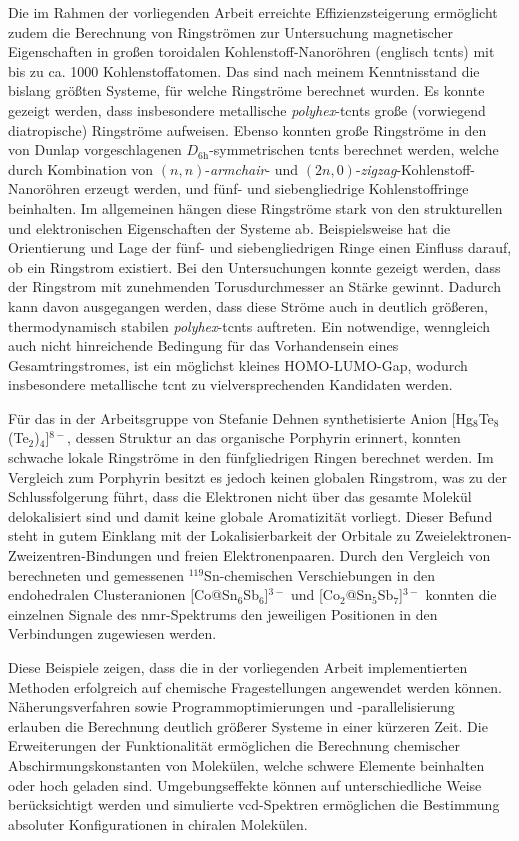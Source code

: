 \bigskip
Die im Rahmen der vorliegenden Arbeit erreichte Effizienzsteigerung ermöglicht zudem die Berechnung von Ringströmen zur Untersuchung magnetischer Eigenschaften in großen toroidalen Kohlenstoff-Nanoröhren (englisch \acfp{tcnt}) mit bis zu ca. 1000 Kohlenstoffatomen. Das sind nach meinem Kenntnisstand die bislang größten Systeme, für welche Ringströme berechnet wurden. Es konnte gezeigt werden, dass insbesondere metallische \textit{polyhex}-\acp{tcnt} große (vorwiegend diatropische) Ringströme aufweisen. Ebenso konnten große Ringströme in den von Dunlap vorgeschlagenen $D_{\text{6h}}$-symmetrischen \acp{tcnt} berechnet werden, welche durch Kombination von $(n,n)$-\textit{armchair}- und $(2n,0)$-\textit{zigzag}-Kohlenstoff-Nanoröhren erzeugt werden, und fünf- und siebengliedrige Kohlenstoffringe beinhalten. Im allgemeinen hängen diese Ringströme stark von den strukturellen und elektronischen Eigenschaften der Systeme ab. Beispielsweise hat die Orientierung und Lage der fünf- und siebengliedrigen Ringe einen Einfluss darauf, ob ein Ringstrom existiert. Bei den Untersuchungen konnte gezeigt werden, dass der Ringstrom mit zunehmenden Torusdurchmesser an Stärke gewinnt. Dadurch kann davon ausgegangen werden, dass diese Ströme auch in deutlich größeren, thermodynamisch stabilen \textit{polyhex}-\acp{tcnt} auftreten. Ein notwendige, wenngleich auch nicht hinreichende Bedingung für das Vorhandensein eines Gesamtringstromes, ist ein möglichst kleines HOMO-LUMO-Gap, wodurch insbesondere metallische \ac{tcnt} zu vielversprechenden Kandidaten werden.

Für das in der Arbeitsgruppe von Stefanie Dehnen synthetisierte Anion [Hg$_8$Te$_8$(Te$_2$)$_4$]$^{8-}$, dessen Struktur an das organische Porphyrin erinnert, konnten schwache lokale Ringströme in den fünfgliedrigen Ringen berechnet werden. Im Vergleich zum Porphyrin besitzt es jedoch keinen globalen Ringstrom, was zu der Schlussfolgerung führt, dass die Elektronen nicht über das gesamte Molekül delokalisiert sind und damit keine globale Aromatizität vorliegt. Dieser Befund steht in gutem Einklang mit der Lokalisierbarkeit der Orbitale zu Zweielektronen-Zweizentren-Bindungen und freien Elektronenpaaren.
Durch den Vergleich von berechneten und gemessenen $^{119}$Sn-chemischen Verschiebungen in den endohedralen Clusteranionen [Co@Sn$_6$Sb$_6$]$^{3-}$ und [Co$_2$@Sn$_5$Sb$_7$]$^{3-}$ konnten die einzelnen Signale des \ac{nmr}-Spektrums den jeweiligen Positionen in den Verbindungen zugewiesen werden.

\bigskip
Diese Beispiele zeigen, dass die in der vorliegenden Arbeit implementierten Methoden erfolgreich auf chemische Fragestellungen angewendet werden können. Näherungsverfahren sowie Programmoptimierungen und -parallelisierung erlauben die Berechnung deutlich größerer Systeme in einer kürzeren Zeit. Die Erweiterungen der Funktionalität ermöglichen die Berechnung chemischer Abschirmungskonstanten von Molekülen, welche schwere Elemente beinhalten oder hoch geladen sind. Umgebungseffekte können auf unterschiedliche Weise berücksichtigt werden und simulierte \ac{vcd}-Spektren ermöglichen die Bestimmung absoluter Konfigurationen in chiralen Molekülen.

